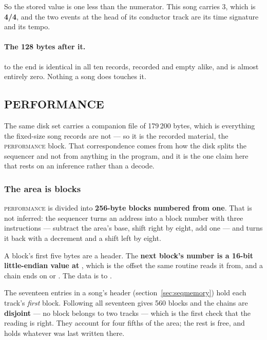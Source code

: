 So the stored value is one less than the numerator. This song carries 3, which is
\textbf{4/4}, and the two events at the head of its conductor track are its time signature
and its tempo.

\paragraph{The 128 bytes after it.}  to the end is identical in all ten
records, recorded and empty alike, and is almost entirely zero. Nothing a song does
touches it.

\subsection{PERFORMANCE}

The same disk set carries a companion file of 179\,200 bytes, which is everything the
fixed-size song records are not --- so it is the recorded material, the
\textsc{performance} block. That correspondence comes from how the disk splits the
sequencer and not from anything in the program, and it is the one claim here that rests
on an inference rather than a decode.

\subsubsection*{The area is blocks}

\textsc{performance} is divided into \textbf{256-byte blocks numbered from one}. That is
not inferred: the sequencer turns an address into a block number with three instructions
--- subtract the area's base, shift right by eight, add one --- and turns it back with a
decrement and a shift left by eight.

A block's first five bytes are a header. The \textbf{next block's number is a 16-bit
little-endian value at }, which is the offset the same routine reads it from,
and a chain ends on  or . The data is  to .

The seventeen entries in a song's header (section~\ref{sec:seqmemory}) hold each track's
\emph{first} block. Following all seventeen gives 560 blocks and the chains are
\textbf{disjoint} --- no block belongs to two tracks --- which is the first check that the
reading is right. They account for four fifths of the area; the rest is free, and holds
whatever was last written there.

